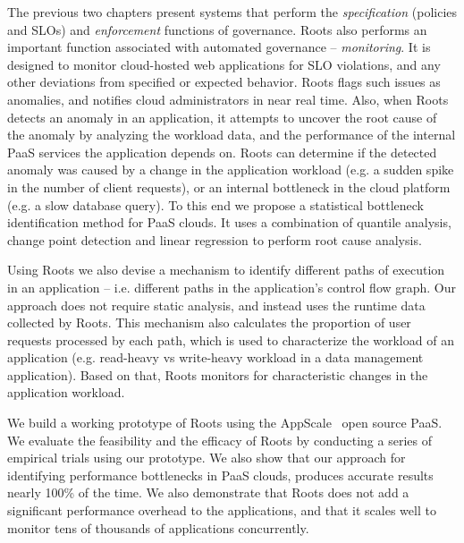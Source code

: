 The previous two chapters present systems that perform the \textit{specification} (policies and SLOs)
and \textit{enforcement} functions of governance.
Roots also performs an important function associated with automated governance -- \textit{monitoring}.
It is designed to monitor cloud-hosted web
applications for SLO violations, and any other deviations from specified or expected behavior. 
Roots flags such issues as anomalies, and notifies cloud administrators in near real time.
Also, when Roots detects an anomaly in an application, it attempts to uncover the
root cause of the anomaly by analyzing the workload data,
and the performance of the internal PaaS services the application depends on. 
Roots can determine if the detected anomaly was caused by a change in the
application workload (e.g. a sudden spike in the number of client requests), or an internal
bottleneck in the cloud platform (e.g. a slow database query). To this end we propose
a statistical bottleneck identification method for PaaS clouds. 
It uses a combination of quantile analysis, change point detection
and linear regression to perform root cause analysis. 

Using Roots we also devise a mechanism to identify different paths of execution in
an application -- i.e. different paths in the application's control flow graph. 
Our approach does not require static analysis, and instead uses the 
runtime data collected by Roots. This mechanism also calculates the proportion of 
user requests processed by each path, which is used to characterize the workload
of an application (e.g. read-heavy vs write-heavy workload in a data management
application). Based on that, Roots monitors for characteristic changes in the application
workload.

We build a working prototype of 
Roots using the AppScale~\cite{6488671} open source PaaS. We evaluate the feasibility and the 
efficacy of Roots by conducting a series of empirical trials using our prototype. 
We also show that our approach for identifying performance bottlenecks
in PaaS clouds, produces accurate results nearly 100\% of the time. 
We also demonstrate that Roots does not add a significant performance overhead
to the applications, and that it scales well to monitor tens of thousands
of applications concurrently.

